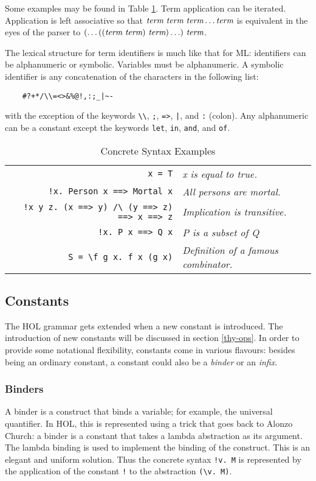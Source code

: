 \documentclass[12pt,fleqn,layout,a4paper]{report}
\newcommand{\term}       {\mbox{\it term}}
\begin{document}
 Some examples may be found in Table \ref{syntaxExamples}. Term
 application can be iterated. Application is left associative so that
 $\term\ \term\ \term \ldots \term$ is equivalent in the eyes of the
 parser to $(\ldots((\term\ \term)\ \term) \ldots)\ \term$.

The lexical structure for term identifiers is much like that for
ML: identifiers can be alphanumeric or symbolic. Variables must be
alphanumeric. A symbolic identifier is any concatenation of the characters
in the following list:
\begin{verbatim}
    #?+*/\\=<>&%@!,:;_|~-
\end{verbatim}
with the exception of the keywords \verb+\\+, \verb+;+, \verb+=>+,
\verb+|+, and \verb+:+ (colon). Any alphanumeric can be a constant except the
keywords \verb+let+, \verb+in+, \verb+and+, and \verb+of+.

 \begin{table}[h]
\begin{center}
 \begin{tabular}{|r|l|} \hline
 \verb+x = T+ & {\it x is equal to true.} \\
 \verb+!x. Person x ==> Mortal x+ & {\it All persons are mortal.} \\
 \verb+!x y z. (x ==> y) /\ (y ==> z) ==> x ==> z+ & {\it Implication is
 transitive.} \\
 \verb+!x. P x ==> Q x+ & {\it P is a subset of Q} \\
 \verb+S = \f g x. f x (g x)+ & {\it Definition of a famous combinator.} \\ \hline
 \end{tabular}
 \caption{Concrete Syntax Examples}\label{syntaxExamples}
\end{center}
 \end{table}


\subsection{Constants}

The HOL grammar gets extended when a new constant is introduced. The
introduction of new constants will be discussed in section
\ref{thy-ops}. In order to provide some notational flexibility,
constants come in various flavours: besides being an ordinary constant,
a constant could also be a {\it binder\/} or an {\it infix}.

\subsubsection{Binders} A binder is a construct that binds a variable;
 for example, the universal quantifier. In HOL, this is represented
 using a trick that goes back to Alonzo Church: a binder is a constant
 that takes a lambda abstraction as its argument. The lambda binding is
 used to implement the binding of the construct. This is an elegant and
 uniform solution. Thus the concrete syntax \verb+!v. M+ is represented
 by the application of the constant \verb+!+ to the abstraction
 \verb+(\v. M)+.
\end{document}
